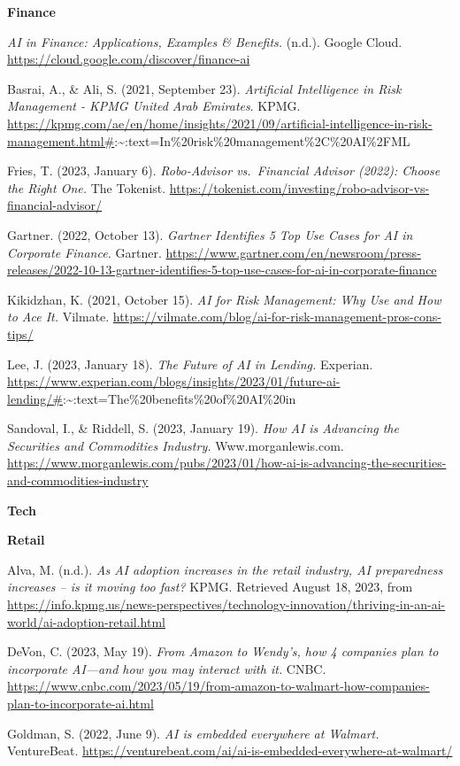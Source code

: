 \documentclass[
]{article}
\begin{document}
\textbf{Finance}

\emph{AI in Finance: Applications, Examples \& Benefits.} (n.d.). Google Cloud. \url{https://cloud.google.com/discover/finance-ai}

Basrai, A., \& Ali, S. (2021, September 23). \emph{Artificial Intelligence in Risk Management - KPMG United Arab Emirates}. KPMG. \url{https://kpmg.com/ae/en/home/insights/2021/09/artificial-intelligence-in-risk-management.html\#}:\textasciitilde:text=In\%20risk\%20management\%2C\%20AI\%2FML

Fries, T. (2023, January 6). \emph{Robo-Advisor vs.~Financial Advisor (2022): Choose the Right One.} The Tokenist. \url{https://tokenist.com/investing/robo-advisor-vs-financial-advisor/}

Gartner. (2022, October 13). \emph{Gartner Identifies 5 Top Use Cases for AI in Corporate Finance.} Gartner. \url{https://www.gartner.com/en/newsroom/press-releases/2022-10-13-gartner-identifies-5-top-use-cases-for-ai-in-corporate-finance}

Kikidzhan, K. (2021, October 15). \emph{AI for Risk Management: Why Use and How to Ace It.} Vilmate. \url{https://vilmate.com/blog/ai-for-risk-management-pros-cons-tips/}

Lee, J. (2023, January 18). \emph{The Future of AI in Lending.} Experian. \url{https://www.experian.com/blogs/insights/2023/01/future-ai-lending/\#}:\textasciitilde:text=The\%20benefits\%20of\%20AI\%20in

Sandoval, I., \& Riddell, S. (2023, January 19). \emph{How AI is Advancing the Securities and Commodities Industry.} Www.morganlewis.com. \url{https://www.morganlewis.com/pubs/2023/01/how-ai-is-advancing-the-securities-and-commodities-industry}

\textbf{Tech}

\textbf{Retail}

Alva, M. (n.d.). \emph{As AI adoption increases in the retail industry, AI preparedness increases -- is it moving too fast?} KPMG. Retrieved August 18, 2023, from \url{https://info.kpmg.us/news-perspectives/technology-innovation/thriving-in-an-ai-world/ai-adoption-retail.html}

DeVon, C. (2023, May 19). \emph{From Amazon to Wendy's, how 4 companies plan to incorporate AI---and how you may interact with it.} CNBC. \url{https://www.cnbc.com/2023/05/19/from-amazon-to-walmart-how-companies-plan-to-incorporate-ai.html}

Goldman, S. (2022, June 9). \emph{AI is embedded everywhere at Walmart.} VentureBeat. \url{https://venturebeat.com/ai/ai-is-embedded-everywhere-at-walmart/}
\end{document}

